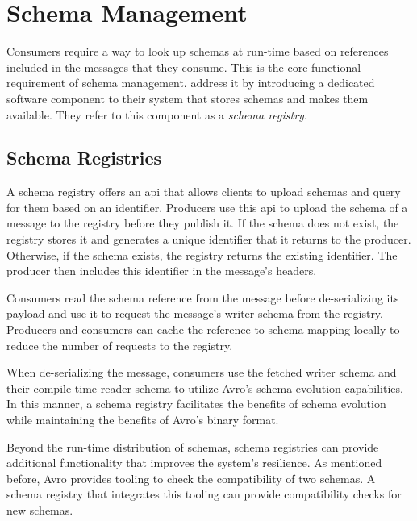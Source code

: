 
\section{Schema Management}\label{sec:schema-management}

Consumers require a way to look up schemas at run-time based on references included in the messages that they consume.
This is the core functional requirement of schema management.
\cite{kreps_kafka_2011} address it by introducing a dedicated software component to their system that stores schemas and makes them available.
They refer to this component as a \emph{schema registry}.

\subsection{Schema Registries}

A schema registry offers an \gls{api} that allows clients to upload schemas and query for them based on an identifier.
Producers use this \gls{api} to upload the schema of a message to the registry before they publish it.
If the schema does not exist, the registry stores it and generates a unique identifier that it returns to the producer.
Otherwise, if the schema exists, the registry returns the existing identifier.
The producer then includes this identifier in the message's headers.

Consumers read the schema reference from the message before de-serializing its payload and use it to request the message's writer schema from the registry.
Producers and consumers can cache the reference-to-schema mapping locally to reduce the number of requests to the registry.

When de-serializing the message, consumers use the fetched writer schema and their compile-time reader schema to utilize Avro's schema evolution capabilities.
In this manner, a schema registry facilitates the benefits of schema evolution while maintaining the benefits of Avro's binary format.

Beyond the run-time distribution of schemas, schema registries can provide additional functionality that improves the system's resilience.
As mentioned before, Avro provides tooling to check the compatibility of two schemas.
A schema registry that integrates this tooling can provide compatibility checks for new schemas.

